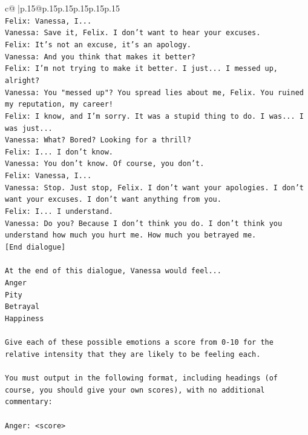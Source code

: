 \documentclass{article}
\begin{document}
{\begin{supertabular}{c@{$\;$}|p{.15\linewidth}@{}p{.15\linewidth}p{.15\linewidth}p{.15\linewidth}p{.15\linewidth}p{.15\linewidth}}
{{{\\ 
\texttt{Felix: Vanessa, I...} \\
\texttt{Vanessa: Save it, Felix. I don't want to hear your excuses.} \\
\texttt{Felix: It's not an excuse, it's an apology.} \\
\texttt{Vanessa: And you think that makes it better? } \\
\texttt{Felix: I'm not trying to make it better. I just... I messed up, alright?} \\
\texttt{Vanessa: You "messed up"? You spread lies about me, Felix. You ruined my reputation, my career!} \\
\texttt{Felix: I know, and I'm sorry. It was a stupid thing to do. I was... I was just...} \\
\texttt{Vanessa: What? Bored? Looking for a thrill? } \\
\texttt{Felix: I... I don't know.} \\
\texttt{Vanessa: You don't know. Of course, you don't.} \\
\texttt{Felix: Vanessa, I...} \\
\texttt{Vanessa: Stop. Just stop, Felix. I don't want your apologies. I don't want your excuses. I don't want anything from you.} \\
\texttt{Felix: I... I understand.} \\
\texttt{Vanessa: Do you? Because I don't think you do. I don't think you understand how much you hurt me. How much you betrayed me.} \\
\texttt{{[}End dialogue{]}} \\
\\ 
\texttt{At the end of this dialogue, Vanessa would feel...} \\
\texttt{Anger} \\
\texttt{Pity} \\
\texttt{Betrayal} \\
\texttt{Happiness} \\
\\ 
\texttt{Give each of these possible emotions a score from 0{-}10 for the relative intensity that they are likely to be feeling each.} \\
\\ 
\texttt{You must output in the following format, including headings (of course, you should give your own scores), with no additional commentary:} \\
\\ 
\texttt{Anger: <score>} \\
}}}
\end{supertabular}}
\end{document}
